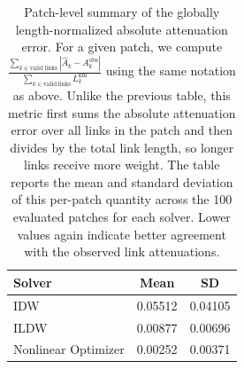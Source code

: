 \documentclass[11pt]{article}
\begin{document}
\begin{table}[H]
  \centering
  \begin{tabular}{lcc}
    \toprule
    Solver & Mean & SD \\
    \midrule
    IDW & 0.05512 & 0.04105 \\
    ILDW & 0.00877 & 0.00696 \\
    Nonlinear Optimizer & 0.00252 & 0.00371 \\
    \bottomrule
  \end{tabular}
  \caption{Patch-level summary of the globally length-normalized absolute attenuation error. For a given patch, we compute $\frac{\sum_{k \in \mathrm{valid\ links}} \left|\hat{A}_k - A_k^{\mathrm{obs}}\right|}{\sum_{k \in \mathrm{valid\ links}} L_k^{\mathrm{km}}}$ using the same notation as above. Unlike the previous table, this metric first sums the absolute attenuation error over all links in the patch and then divides by the total link length, so longer links receive more weight. The table reports the mean and standard deviation of this per-patch quantity across the 100 evaluated patches for each solver. Lower values again indicate better agreement with the observed link attenuations.}
\end{table}
\end{document}
